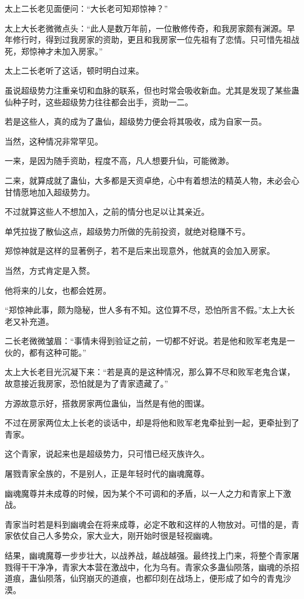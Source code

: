\begin{this_body}
太上二长老见面便问：“大长老可知郑惊神？”

太上大长老微微点头：“此人是数万年前，一位散修传奇，和我房家颇有渊源。早年修行时，得到过我房家的资助，更且和我房家一位先祖有了恋情。只可惜先祖战死，郑惊神才未加入房家。”

太上二长老听了这话，顿时明白过来。

虽说超级势力注重亲切和血脉的联系，但也时常会吸收新血。尤其是发现了某些蛊仙种子时，这些超级势力往往都会出手，资助一二。

若是这些人，真的成为了蛊仙，超级势力便会将其吸收，成为自家一员。

当然，这种情况非常罕见。

一来，是因为随手资助，程度不高，凡人想要升仙，可能微渺。

二来，就算成就了蛊仙，大多都是天资卓绝，心中有着想法的精英人物，未必会心甘情愿地加入超级势力。

不过就算这些人不想加入，之前的情分也足以让其亲近。

单凭拉拢了散仙这点，超级势力所做的先前投资，就绝对稳赚不亏。

郑惊神就是这样的显著例子，若不是后来出现意外，他就真的会加入房家。

当然，方式肯定是入赘。

他将来的儿女，也都会姓房。

“郑惊神此事，颇为隐秘，世人多有不知。这位算不尽，恐怕所言不假。”太上大长老又补充道。

二长老微微皱眉：“事情未得到验证之前，一切都不好说。若是他和败军老鬼是一伙的，都有这种可能。”

太上大长老目光沉凝下来：“若是真的是这种情况，那么算不尽和败军老鬼合谋，故意接近我房家，恐怕就是为了青家遗藏了。”

方源故意示好，搭救房家两位蛊仙，当然是有他的图谋。

不过在房家两位太上长老的谈话中，却是将他和败军老鬼牵扯到一起，更牵扯到了青家。

这个青家，说起来也是超级势力，只可惜已经灭族许久。

屠戮青家全族的，不是别人，正是年轻时代的幽魂魔尊。

幽魂魔尊并未成尊的时候，因为某个不可调和的矛盾，以一人之力和青家上下激战。

青家当时若是料到幽魂会在将来成尊，必定不敢和这样的人物放对。可惜的是，青家依仗自己人多势众，家大业大，刚开始时很是轻视幽魂。

结果，幽魂魔尊一步步壮大，以战养战，越战越强。最终找上门来，将整个青家屠戮得干干净净，青家大本营在激战中，化为乌有。青家众多蛊仙陨落，幽魂的杀招道痕，蛊仙陨落，仙窍崩灭的道痕，也都印刻在战场上，便形成了如今的青鬼沙漠。


\end{this_body}
